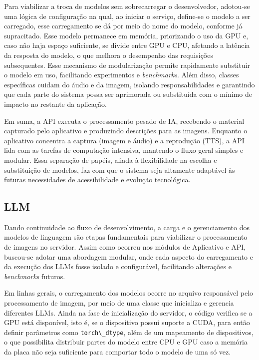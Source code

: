 Para viabilizar a troca de modelos sem sobrecarregar o desenvolvedor, adotou-se uma lógica de configuração na qual, ao iniciar o serviço, define-se o modelo a ser carregado, esse carregamento se dá por meio do nome do modelo, conforme já supracitado. Esse modelo permanece em memória, priorizando o uso da GPU e, caso não haja espaço suficiente, se divide entre GPU e CPU, afetando a latência da resposta do modelo, o que melhora o desempenho das requisições subsequentes. Esse mecanismo de modularização permite rapidamente substituir o modelo em uso, facilitando experimentos e \textit{benchmarks}. Além disso, classes específicas cuidam do áudio e da imagem, isolando responsabilidades e garantindo que cada parte do sistema possa ser aprimorada ou substituída com o mínimo de impacto no restante da aplicação.

Em suma, a API executa o processamento pesado de IA, recebendo o material capturado pelo aplicativo e produzindo descrições para as imagens. Enquanto o aplicativo concentra a captura (imagem e áudio) e a reprodução (TTS), a API lida com as tarefas de computação intensiva, mantendo o fluxo geral simples e modular. Essa separação de papéis, aliada à flexibilidade na escolha e substituição de modelos, faz com que o sistema seja altamente adaptável às futuras necessidades de acessibilidade e evolução tecnológica.

\subsection{LLM}

Dando continuidade ao fluxo de desenvolvimento, a carga e o gerenciamento dos modelos de linguagem são etapas fundamentais para viabilizar o processamento de imagens no servidor. Assim como ocorreu nos módulos de Aplicativo e API, buscou-se adotar uma abordagem modular, onde cada aspecto do carregamento e da execução dos LLMs fosse isolado e configurável, facilitando alterações e \textit{benchmarks} futuros.

Em linhas gerais, o carregamento dos modelos ocorre no arquivo responsável pelo processamento de imagem, por meio de uma classe que inicializa e gerencia diferentes LLMs. Ainda na fase de inicialização do servidor, o código verifica se a GPU está disponível, isto é, se o dispositivo possui suporte a CUDA, para então definir parâmetros como \lstinline{torch\_dtype}, além de um mapeamento de dispositivos, o que possibilita distribuir partes do modelo entre CPU e GPU caso a memória da placa não seja suficiente para comportar todo o modelo de uma só vez.

